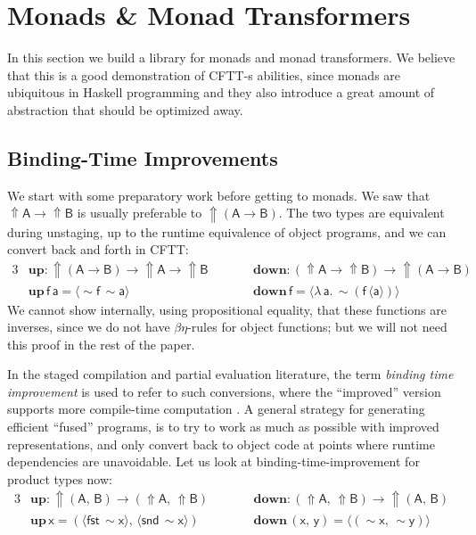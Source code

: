 \documentclass[acmsmall,screen,review,anonymous]{acmart}
\newcommand{\msf}[1]{{\mathsf{#1}}}
\newcommand{\mbf}[1]{{\mathbf{#1}}}
\newcommand{\bs}[1]{\boldsymbol{#1}}
\newcommand{\ind}{\hspace{1em}}
\newcommand{\lam}{\lambda\,}
\newcommand{\vA}{\mathsf{A}}
\newcommand{\vB}{\mathsf{B}}
\newcommand{\va}{\mathsf{a}}
\newcommand{\vx}{\mathsf{x}}
\newcommand{\vy}{\mathsf{y}}
\newcommand{\vf}{\mathsf{f}}
\newcommand{\Up}{{\Uparrow}}
\newcommand{\spl}{{\bs{\sim}}}
\newcommand{\ql}{{\bs{\langle}}}
\newcommand{\qr}{{\bs{\rangle}}}
\newcommand{\fst}{\msf{fst}}
\newcommand{\snd}{\msf{snd}}
\theoremstyle{remark}
\newcommand{\mup}{\mbf{up}}
\newcommand{\mdown}{\mbf{down}}
\newcommand{\qt}[1]{\ql#1\qr}
\begin{document}
\section{Monads \& Monad Transformers}\label{sec:monad-transformers}

In this section we build a library for monads and monad transformers. We believe
that this is a good demonstration of CFTT-s abilities, since monads are
ubiquitous in Haskell programming and they also introduce a great amount of
abstraction that should be optimized away.

\subsection{Binding-Time Improvements}\label{sec:binding-time-improvements}

We start with some preparatory work before getting to monads. We saw that $\Up
\vA \to \Up \vB$ is usually preferable to $\Up(\vA \to \vB)$. The two types are
equivalent during unstaging, up to the runtime equivalence of object programs,
and we can convert back and forth in CFTT:
\begin{alignat*}{3}
  &\mup : \Up (\vA \to \vB) \to \Up \vA \to \Up \vB && \ind\ind \mdown : (\Up \vA \to \Up \vB) \to \Up (\vA \to \vB) \\
  &\mup\,\vf\,\va = \ql \spl \vf\, \spl \va\qr   && \ind\ind \mdown\,\vf = \ql \lam \va.\,\spl(\vf\,\ql \va \qr) \qr
\end{alignat*}
We cannot show internally, using propositional equality, that these functions are
inverses, since we do not have $\beta\eta$-rules for object functions; but we
will not need this proof in the rest of the paper.

In the staged compilation and partial evaluation literature, the term
\emph{binding time improvement} is used to refer to such conversions, where the
``improved'' version supports more compile-time computation
\cite{partial-evaluation}. A general strategy for generating efficient ``fused''
programs, is to try to work as much as possible with improved representations,
and only convert back to object code at points where runtime dependencies are
unavoidable. Let us look at binding-time-improvement for product types now:
\begin{alignat*}{3}
  &\mup : \Up (\vA,\,\vB) \to (\Up \vA,\,\Up \vB) && \ind\ind \mdown : (\Up \vA,\,\Up \vB) \to \Up(\vA,\,\vB) \\
  &\mup\,\vx = (\qt{\fst\,\spl \vx},\, \qt{\snd\,\spl \vx})   && \ind\ind \mdown\,(\vx,\,\vy) = \qt{(\spl \vx,\,\spl \vy)}
\end{alignat*}
\end{document}
